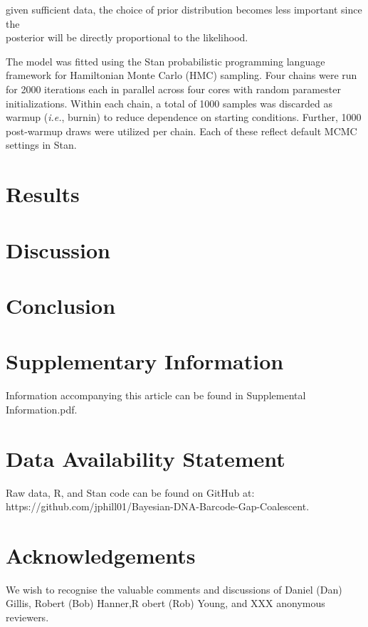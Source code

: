 \documentclass[12pt]{article}
\begin{document}
\noindent given sufficient data, the choice of prior distribution becomes less important since the \\ posterior will be directly proportional to the likelihood.

The model was fitted using the Stan probabilistic programming language  \citep{carpenter2017stan} framework for Hamiltonian Monte Carlo (HMC) sampling. Four chains were run for 2000 iterations each in parallel across four cores with random paramester initializations. Within each chain, a total of 1000 samples was discarded as warmup (\textit{i.e.}, burnin) to reduce dependence on starting conditions. Further, 1000 post-warmup draws were utilized per chain. Each of these reflect default MCMC settings in Stan. 


\section{Results}

\section{Discussion}

\section{Conclusion}


\newpage

\section*{Supplementary Information}

Information accompanying this article can be found in Supplemental Information.pdf.

\section*{Data Availability Statement}

Raw data, R, and Stan code can be found on GitHub at: \\ https://github.com/jphill01/Bayesian-DNA-Barcode-Gap-Coalescent.

\section*{Acknowledgements}

We wish to recognise the valuable comments and discussions of Daniel (Dan) Gillis, Robert (Bob) Hanner,R obert (Rob) Young, and XXX anonymous reviewers.
\end{document}
